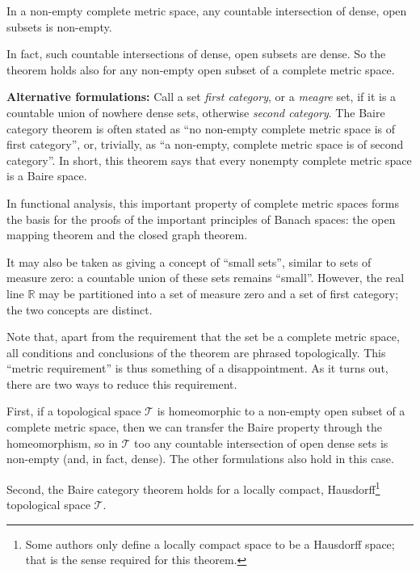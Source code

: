 \documentclass[12pt]{article}
\begin{document}
In a non-empty complete metric space, any countable intersection of dense, open subsets is non-empty.

In fact, such countable intersections of dense, open subsets are dense.  So the theorem holds also for any non-empty open subset of a complete metric space.

\textbf{Alternative formulations:}
Call a set \emph{first category}, or a \emph{meagre} set, if it is a countable union of nowhere dense sets, otherwise \emph{second category}. The Baire category theorem is often stated as ``no non-empty complete metric space is of first category'', or, trivially, as ``a non-empty, complete metric space is of second category''. In short, this theorem says that every nonempty complete metric space is a Baire space.

In functional analysis, this important property of complete metric spaces forms the {b}asis for the proofs of the important principles of Banach spaces: the open mapping theorem and the closed graph theorem.

It may also be taken as giving a concept of ``small sets'', similar to sets of measure zero: a countable union of these sets remains ``small''.  However, the real line $\mathbb{R}$ may be partitioned into a set of measure zero and a set of first category; the two concepts are distinct.

Note that, apart from the requirement that the set be a complete metric space, all conditions and conclusions of the theorem are phrased topologically.  This ``metric requirement'' is thus something of a disappointment.  As it turns out, there are two ways to reduce this requirement.

First, if a topological space $\mathcal{T}$ is homeomorphic to a non-empty open subset of a complete metric space, then we can transfer the Baire property through the homeomorphism, so in $\mathcal{T}$ too any countable intersection of open dense sets is non-empty (and, in fact, dense).  The other formulations also hold in this case.

Second, the Baire category theorem holds for a locally compact, Hausdorff\footnote{Some authors only define a locally compact space to be a Hausdorff space; that is the sense required for this theorem.} topological space  $\mathcal{T}$.
\end{document}
